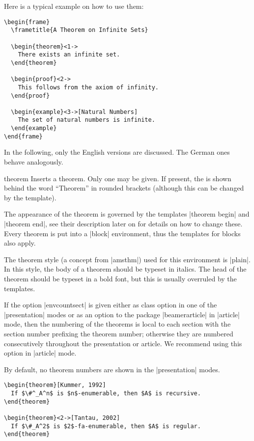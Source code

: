 Here is a typical example on how to use them:
\begin{verbatim}
\begin{frame}
  \frametitle{A Theorem on Infinite Sets}

  \begin{theorem}<1->
    There exists an infinite set.
  \end{theorem}

  \begin{proof}<2->
    This follows from the axiom of infinity.
  \end{proof}

  \begin{example}<3->[Natural Numbers]
    The set of natural numbers is infinite.
  \end{example}
\end{frame}
\end{verbatim}

In the following, only the English versions are discussed. The German ones behave analogously.

\begin{environment}{{theorem}}
  Inserts a theorem. Only one  may be given. If present, the  is shown behind the word ``Theorem'' in rounded brackets (although this can be changed by the template).

  The appearance of the theorem is governed by the templates |theorem begin| and |theorem end|, see their description later on for details on how to change these. Every theorem is put into a |block| environment, thus the templates for blocks also apply.

  The theorem style (a concept from |amsthm|) used for this environment is |plain|. In this style, the body of a theorem should be typeset in italics. The head of the theorem should be typeset in a bold font, but this is usually overruled by the templates.

  If the option |envcountsect| is given either as class option in one of the |presentation| modes or as an option to the package |beamerarticle| in |article| mode, then the numbering of the theorems is local to each section with the section number prefixing the theorem number; otherwise they are numbered consecutively throughout the presentation or article. We recommend using this option in |article| mode.

  By default, no theorem numbers are shown in the |presentation| modes.

  \example
\begin{verbatim}
\begin{theorem}[Kummer, 1992]
  If $\#^_A^n$ is $n$-enumerable, then $A$ is recursive.
\end{theorem}

\begin{theorem}<2->[Tantau, 2002]
  If $\#_A^2$ is $2$-fa-enumerable, then $A$ is regular.
\end{theorem}
\end{verbatim}

\end{environment}

